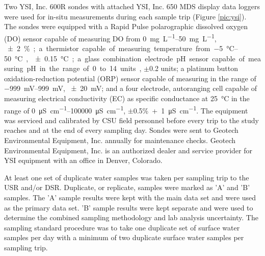 Two YSI, Inc. 600R sondes with attached YSI, Inc. 650 MDS display data loggers were used for in-situ measurements during each sample trip (Figure \ref{pic:ysi}).  The sondes were equipped with a Rapid Pulse polarographic dissolved oxygen (DO) sensor capable of measuring DO from \SIrange{0}{50}{\milli\gram\per\liter}, \SI{\pm2}\%; a thermistor capable of measuring temperature from \SIrange{-5}{50}{\degreeCelsius}, \SI{\pm0.15}{\degreeCelsius}; a glass combination electrode pH sensor capable of measuring pH in the range of 0 to 14 units, $\pm$0.2 units; a platinum button oxidation-reduction potential (ORP) sensor capable of measuring in the range of \SIrange{-999}{999}{\milli\volt}, \SI{\pm20}{\milli\volt}; and a four electrode, autoranging  cell capable of measuring electrical conductivity (EC) as specific conductance at \SI{25}{\degreeCelsius} in the range of \SIrange{0}{100000}{\micro\siemens\per\centi\meter}, $\pm$0.5\%~+~\SI{1}{\micro\siemens\per\centi\meter}.  The equipment was serviced and calibrated by CSU field personnel before every trip to the study reaches and at the end of every sampling day.  Sondes were sent to Geotech Environmental Equipment, Inc. annually for maintenance checks.  Geotech Environmental Equipment, Inc. is an authorized dealer and service provider for YSI equipment with an office in Denver, Colorado.

At least one set of duplicate water samples was taken per sampling trip to the USR and/or DSR.  Duplicate, or replicate, samples were marked as 'A' and 'B' samples.  The 'A' sample results were kept with the main data set and were used as the primary data set.  'B' sample results were kept separate and were used to determine the combined sampling methodology and lab analysis uncertainty.  The sampling standard procedure was to take one duplicate set of surface water samples per day with a minimum of two duplicate surface water samples per sampling trip.

